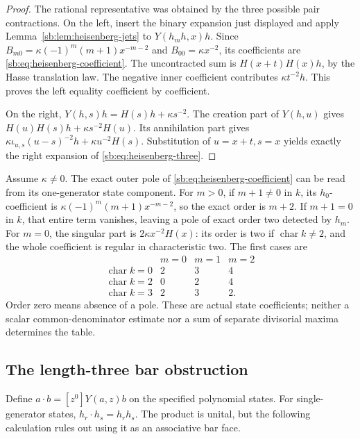 \begin{proof}
The rational representative was obtained by the three possible pair
contractions.  On the left, insert the binary expansion just displayed
and apply Lemma~\ref{sb:lem:heisenberg-jets} to \(Y(h_mh,x)h\).
Since \(B_{m0}=\kappa(-1)^m(m+1)x^{-m-2}\) and
\(B_{00}=\kappa x^{-2}\), its coefficients are
\eqref{sb:eq:heisenberg-coefficient}.  The uncontracted sum is
\(H(x+t)H(x)h\), by the Hasse translation law.
The negative inner coefficient contributes \(\kappa t^{-2}h\).
This proves the left equality coefficient by coefficient.

On the right, \(Y(h,s)h=H(s)h+\kappa s^{-2}\).
The creation part of \(Y(h,u)\) gives
\(H(u)H(s)h+\kappa s^{-2}H(u)\).
Its annihilation part gives
\(\kappa\iota_{u,s}(u-s)^{-2}h+\kappa u^{-2}H(s)\).
Substitution of \(u=x+t,s=x\) yields exactly the right expansion
of \eqref{sb:eq:heisenberg-three}.
\end{proof}

Assume \(\kappa\ne0\).  The exact outer pole of
\eqref{sb:eq:heisenberg-coefficient} can be read from its one-generator
state component.  For \(m>0\), if \(m+1\ne0\) in \(k\),
its \(h_0\)-coefficient is
\(\kappa(-1)^m(m+1)x^{-m-2}\), so the exact order is \(m+2\).
If \(m+1=0\) in \(k\), that entire term vanishes, leaving a
pole of exact order two detected by \(h_m\).
For \(m=0\), the singular part is
\(2\kappa x^{-2}H(x)\): its order is two if
\(\operatorname{char}k\ne2\), and the whole coefficient is
regular in characteristic two.  The first cases are
\[
 \begin{array}{c|ccc}
 &m=0&m=1&m=2\\\hline
 \operatorname{char}k=0&2&3&4\\
 \operatorname{char}k=2&0&2&4\\
 \operatorname{char}k=3&2&3&2.
 \end{array}
\]
Order zero means absence of a pole.  These are actual state coefficients;
neither a scalar common-denominator estimate nor a sum of separate
divisorial maxima determines the table.

\subsection{The length-three bar obstruction}

Define \(a\cdot b=[z^0]Y(a,z)b\) on the specified polynomial
states.  For single-generator states, \(h_r\cdot h_s=h_rh_s\).
The product is unital, but the following calculation rules out using
it as an associative bar face.

